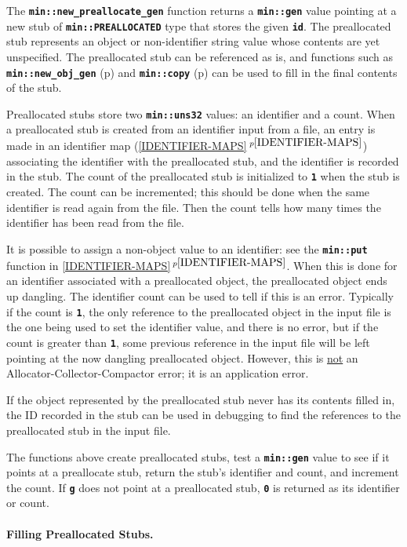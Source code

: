 \documentclass[12pt]{article}
\newcommand{\subsubsubsection}[1]{\paragraph[#1]{#1.}}
\newcommand{\TT}[1]{{\tt \bfseries #1}}
\newcommand{\itemref}[1]{\ref{#1}$\,^{p\pageref{#1}}$}
\newcommand{\pagref}[1]{p\pageref{#1}}
\newcommand{\EOL}{\penalty \exhyphenpenalty}
\begin{document}
The \TT{min::new\_preallocate\_gen} function returns a
\TT{min::gen} value pointing at a new stub
of \TT{min::\EOL PREALLOCATED}\label{MIN::PREALLOCATED}
type that stores the given \TT{id}.  The preallocated
stub represents an object or non-identifier string value
whose contents are yet unspecified.
The preallocated stub can be
referenced as is, and functions such as
\TT{min::\EOL new\_\EOL obj\_\EOL gen} (\pagref{MIN::PREALLOCATED_NEW_OBJ_GEN})
and \TT{min::\EOL copy} (\pagref{MIN::PREALLOCATED_COPY_UNUSED})
can be used to fill in the final contents of the stub.

Preallocated stubs store two \TT{min::uns32} values: an identifier
and a count.  When a preallocated stub is created from an identifier input
from a file, an entry is made in an identifier map
(\itemref{IDENTIFIER-MAPS}) associating the identifier with the
preallocated stub, and the identifier is recorded in the stub.
The count of the preallocated stub is initialized
to \TT{1} when the stub is created.  The count can be incremented; this
should be done when the same identifier is read again from
the file.  Then the count tells how many times the identifier
has been read from the file.

It is possible to assign a non-object value to an identifier:
see the \TT{min::\EOL put} function in \itemref{IDENTIFIER-MAPS}.
When this is done for an identifier associated with a preallocated
object, the preallocated object ends up dangling.  The identifier
count can be used to tell if this is an error.  Typically if the
count is \TT{1}, the only reference to the preallocated object in
the input file is the one being used to set the identifier value,
and there is no error, but if the count is greater than \TT{1},
some previous reference in the input file will be left pointing
at the now dangling preallocated object.  However, this is
\underline{not} an Allocator-Collector-Compactor error;
it is an application error.

If the object represented by the preallocated stub never
has its contents filled in, the ID recorded in the stub can be used
in debugging to find the references to the preallocated stub in the
input file.

The functions above create preallocated stubs,
test a \TT{min::gen} value to see if it points at a
preallocate stub, return the stub's identifier and count, and increment
the count.  If \TT{g} does not point at a preallocated
stub, \TT{0} is returned as its identifier or count.

\subsubsubsection{Filling Preallocated Stubs}
\label{FILLING-PREALLOCATED-STUBS}
\end{document}
